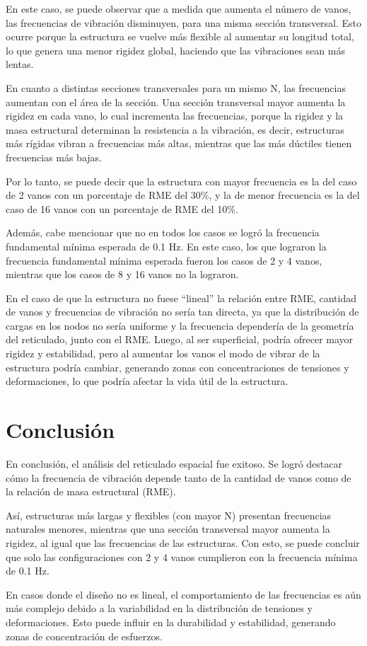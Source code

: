 En este caso, se puede observar que a medida que aumenta el número de vanos, las frecuencias de vibración disminuyen, para una misma sección transversal. Esto ocurre porque la estructura se vuelve más flexible al aumentar su longitud total, lo que genera una menor rigidez global, haciendo que las vibraciones sean más lentas.

En cuanto a distintas secciones transversales para un mismo N, las frecuencias aumentan con el área de la sección. Una sección transversal mayor aumenta la rigidez en cada vano, lo cual incrementa las frecuencias, porque la rigidez y la masa estructural determinan la resistencia a la vibración, es decir, estructuras más rígidas vibran a frecuencias más altas, mientras que las más dúctiles tienen frecuencias más bajas.

Por lo tanto, se puede decir que la estructura con mayor frecuencia es la del caso de 2 vanos con un porcentaje de RME del 30\%, y la de menor frecuencia es la del caso de 16 vanos con un porcentaje de RME del 10\%.

Además, cabe mencionar que no en todos los casos se logró la frecuencia fundamental mínima esperada de 0.1 Hz. En este caso, los que lograron la frecuencia fundamental mínima esperada fueron los casos de 2 y 4 vanos, mientras que los casos de 8 y 16 vanos no la lograron.

En el caso de que la estructura no fuese ``lineal'' la relación entre RME, cantidad de vanos y frecuencias de vibración no sería tan directa, ya que la distribución de cargas en los nodos no sería uniforme y la frecuencia dependería de la geometría del reticulado, junto con el RME. Luego, al ser superficial, podría ofrecer mayor rigidez y estabilidad, pero al aumentar los vanos el modo de vibrar de la estructura podría cambiar, generando zonas con concentraciones de tensiones y deformaciones, lo que podría afectar la vida útil de la estructura.

\newpage

\section{Conclusión}

En conclusión, el análisis del reticulado espacial fue exitoso. Se logró destacar cómo la frecuencia de vibración depende tanto de la cantidad de vanos como de la relación de masa estructural (RME). 

Así, estructuras más largas y flexibles (con mayor N) presentan frecuencias naturales menores, mientras que una sección transversal mayor aumenta la rigidez, al igual que las frecuencias de las estructuras. Con esto, se puede concluir que solo las configuraciones con 2 y 4 vanos cumplieron con la frecuencia mínima de 0.1 Hz.

En casos donde el diseño no es lineal, el comportamiento de las frecuencias es aún más complejo debido a la variabilidad en la distribución de tensiones y deformaciones. Esto puede influir en la durabilidad y estabilidad, generando zonas de concentración de esfuerzos. 
